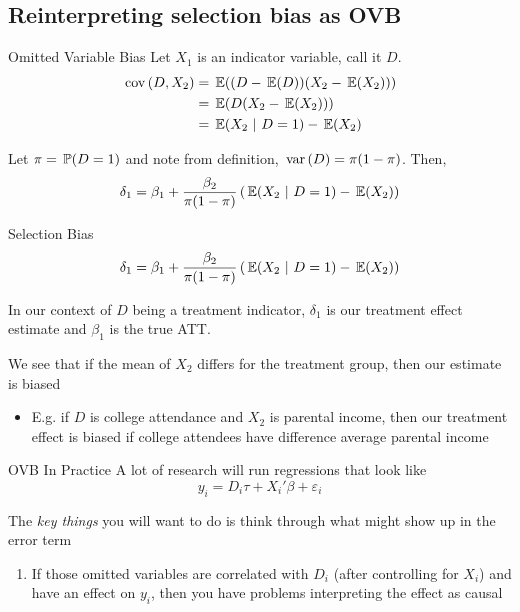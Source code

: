 \documentclass[aspectratio=169,t,11pt,table]{beamer}
\begin{document}
\subsection{Reinterpreting selection bias as OVB}

\begin{frame}{Omitted Variable Bias}
  Let $X_1$ is an indicator variable, call it $D$. 
  \begin{align*}
    \cov{D, X_2} 
    &= \expec{ (D - \expec{D}) (X_2 - \expec{X_2})} \\
    &= \expec{D (X_2 - \expec{X_2})} \\
    &= \expec{X_2}{D = 1} - \expec{X_2}
  \end{align*}

  Let $\pi = \prob{D = 1}$ and note from definition, $\var{D} = \pi (1 - \pi)$. Then,
  $$
    \delta_1 = \beta_1 + \frac{\beta_2}{\pi (1 - \pi)} \left( \expec{X_2}{D = 1} - \expec{X_2} \right)
  $$
\end{frame}

\begin{frame}{Selection Bias}
  \vspace*{-\bigskipamount}
  $$
    \delta_1 = \beta_1 + \frac{\beta_2}{\pi (1 - \pi)} \left( \expec{X_2}{D = 1} - \expec{X_2} \right)
  $$

  \bigskip
  In our context of $D$ being a treatment indicator, $\delta_1$ is our treatment effect estimate and $\beta_1$ is the true ATT.

  \pause
  \bigskip
  We see that if the mean of $X_2$ differs for the treatment group, then our estimate is biased
  \begin{itemize}
    \item E.g. if $D$ is college attendance and $X_2$ is parental income, then our treatment effect is biased if college attendees have difference average parental income
  \end{itemize}
\end{frame}


\begin{frame}{OVB In Practice}
  A lot of research will run regressions that look like 
  $$
    y_i = D_i \tau + X_i' \beta + \varepsilon_i
  $$

  \bigskip
  The \emph{key things} you will want to do is think through what might show up in the error term
  \begin{enumerate}
    \item If those omitted variables are correlated with $D_i$ (after controlling for $X_i$) and have an effect on $y_i$, then you have problems interpreting the effect as causal
  \end{enumerate}
\end{frame}
\end{document}
